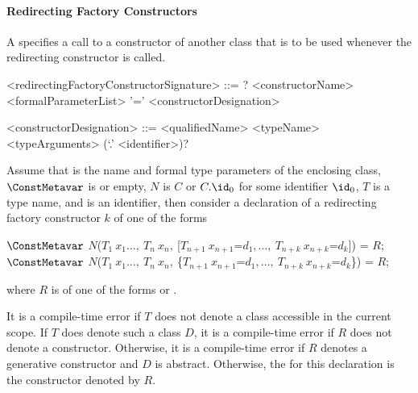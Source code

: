\documentclass[makeidx]{article}
\begin{document}
\paragraph{Redirecting Factory Constructors}

\LMHash{}%
A 
specifies a call to a constructor of another class that is to be used
whenever the redirecting constructor is called.

\begin{grammar}
<redirectingFactoryConstructorSignature> ::= \gnewline{}
  \CONST? \FACTORY{} <constructorName> <formalParameterList> '=' \gnewline{}
  <constructorDesignation>

<constructorDesignation> ::= <qualifiedName>
  \alt <typeName> <typeArguments> (`.' <identifier>)?
\end{grammar}

Assume that
is the name and formal type parameters of the enclosing class,
$\ConstMetavar$ is \CONST{} or empty,
$N$ is $C$ or $C.\id_0$ for some identifier $\id_0$,
$T$ is a type name, and \id{} is an identifier,
then consider a declaration of a redirecting factory constructor $k$ of one of the forms

\begin{normativeDartCode}
$\ConstMetavar$ \FACTORY{}
    $N$($T_1\ x_1 \ldots,\ T_n\ x_n,\ $[$T_{n+1}\ x_{n+1}$=$d_1, \ldots,\ T_{n+k}\ x_{n+k}$=$d_k$]) = $R$;
\\
$\ConstMetavar$ \FACTORY{}
    $N$($T_1\ x_1 \ldots,\ T_n\ x_n,\ $\{$T_{n+1}\ x_{n+1}$=$d_1, \ldots,\ T_{n+k}\ x_{n+k}$=$d_k$\}) = $R$;
\end{normativeDartCode}

\noindent
where $R$ is of one of the forms
 or
.

\LMHash{}%
It is a compile-time error if $T$ does not denote
a class accessible in the current scope.
If $T$ does denote such a class $D$,
it is a compile-time error if $R$ does not denote a constructor.
Otherwise, it is a compile-time error
if $R$ denotes a generative constructor and $D$ is abstract.
Otherwise, the
for this declaration is the constructor denoted by $R$.
\end{document}
